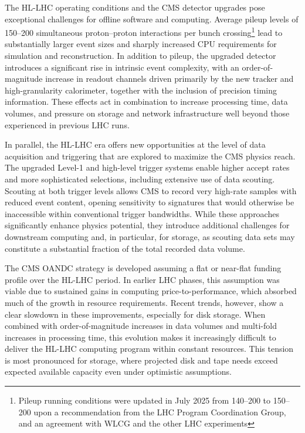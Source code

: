 The HL-LHC operating conditions and the CMS detector upgrades pose exceptional challenges for offline software and computing. Average pileup levels of 150--200 simultaneous proton–proton interactions per bunch crossing\footnote{Pileup running conditions were updated in July 2025 from 140--200 to 150--200 upon a recommendation from the LHC Program Coordination Group, and an agreement with WLCG and the other LHC experiments} lead to substantially larger event sizes and sharply increased CPU requirements for simulation and reconstruction. In addition to pileup, the upgraded detector introduces a significant rise in intrinsic event complexity, with an order-of-magnitude increase in readout channels driven primarily by the new tracker and high-granularity calorimeter, together with the inclusion of precision timing information. These effects act in combination to increase processing time, data volumes, and pressure on storage and network infrastructure well beyond those experienced in previous LHC runs.

In parallel, the HL-LHC era offers new opportunities at the level of data acquisition and triggering that are explored to maximize the CMS physics reach. The upgraded Level-1 and high-level trigger systems enable higher accept rates and more sophisticated selections, including extensive use of data scouting. Scouting at both trigger levels allows CMS to record very high-rate samples with reduced event content, opening sensitivity to signatures that would otherwise be inaccessible within conventional trigger bandwidths. While these approaches significantly enhance physics potential, they introduce additional challenges for downstream computing and, in particular, for storage, as scouting data sets may constitute a substantial fraction of the total recorded data volume.

The CMS \gls{OANDC} strategy is developed assuming a flat or near-flat funding profile over the HL-LHC period. In earlier LHC phases, this assumption was viable due to sustained gains in computing price-to-performance, which absorbed much of the growth in resource requirements. Recent trends, however, show a clear slowdown in these improvements, especially for disk storage. When combined with order-of-magnitude increases in data volumes and multi-fold increases in processing time, this evolution makes it increasingly difficult to deliver the HL-LHC computing program within constant resources. This tension is most pronounced for storage, where projected disk and tape needs exceed expected available capacity even under optimistic assumptions.

